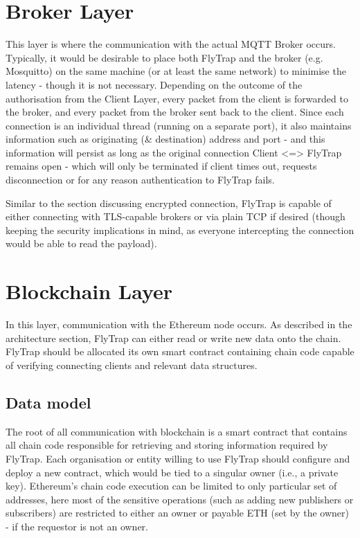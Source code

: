 \section{Broker Layer}

This layer is where the communication with the actual MQTT Broker occurs. Typically, it would be desirable to place both FlyTrap and the broker (e.g. Mosquitto) on the same machine (or at least the same network) to minimise the latency - though it is not necessary. Depending on the outcome of the authorisation from the Client Layer, every packet from the client is forwarded to the broker, and every packet from the broker sent back to the client. Since each connection is an individual thread (running on a separate port), it also maintains information such as originating (\& destination) address and port - and this information will persist as long as the original connection Client <=> FlyTrap remains open - which will only be terminated if client times out, requests disconnection or for any reason authentication to FlyTrap fails.

Similar to the section discussing encrypted connection, FlyTrap is capable of either connecting with TLS-capable brokers or via plain TCP if desired (though keeping the security implications in mind, as everyone intercepting the connection would be able to read the payload).

\section{Blockchain Layer}
In this layer, communication with the Ethereum node occurs. As described in the architecture section, FlyTrap can either read or write new data onto the chain. FlyTrap should be allocated its own smart contract containing chain code capable of verifying connecting clients and relevant data structures. 
\subsection{Data model}
The root of all communication with blockchain is a smart contract that contains all chain code responsible for retrieving and storing information required by FlyTrap. Each organisation or entity willing to use FlyTrap should configure and deploy a new contract, which would be tied to a singular owner (i.e., a private key). Ethereum's chain code execution can be limited to only particular set of addresses, here most of the sensitive operations (such as adding new publishers or subscribers) are restricted to either an owner or payable ETH (set by the owner) - if the requestor is not an owner.

